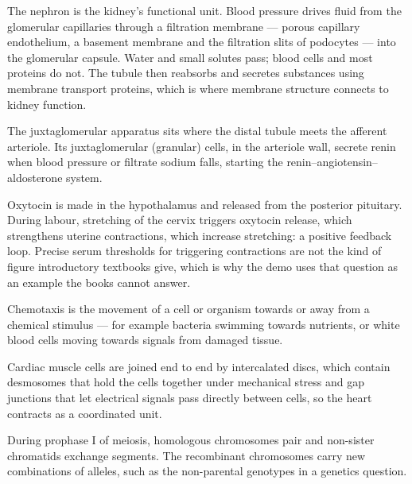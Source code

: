\begin{background}
The nephron is the kidney's functional unit. Blood pressure drives fluid from the glomerular capillaries through a filtration membrane --- porous capillary endothelium, a basement membrane and the filtration slits of podocytes --- into the glomerular capsule. Water and small solutes pass; blood cells and most proteins do not. The tubule then reabsorbs and secretes substances using membrane transport proteins, which is where membrane structure connects to kidney function.
\end{background}

\begin{background}
The juxtaglomerular apparatus sits where the distal tubule meets the afferent arteriole. Its juxtaglomerular (granular) cells, in the arteriole wall, secrete renin when blood pressure or filtrate sodium falls, starting the renin--angiotensin--aldosterone system.
\end{background}

\begin{background}
Oxytocin is made in the hypothalamus and released from the posterior pituitary. During labour, stretching of the cervix triggers oxytocin release, which strengthens uterine contractions, which increase stretching: a positive feedback loop. Precise serum thresholds for triggering contractions are not the kind of figure introductory textbooks give, which is why the demo uses that question as an example the books cannot answer.
\end{background}

\begin{background}[chemotaxis]
Chemotaxis is the movement of a cell or organism towards or away from a chemical stimulus --- for example bacteria swimming towards nutrients, or white blood cells moving towards signals from damaged tissue.
\end{background}

\begin{background}
Cardiac muscle cells are joined end to end by intercalated discs, which contain desmosomes that hold the cells together under mechanical stress and gap junctions that let electrical signals pass directly between cells, so the heart contracts as a coordinated unit.
\end{background}

\begin{background}
During prophase I of meiosis, homologous chromosomes pair and non-sister chromatids exchange segments. The recombinant chromosomes carry new combinations of alleles, such as the non-parental genotypes in a genetics question.
\end{background}

